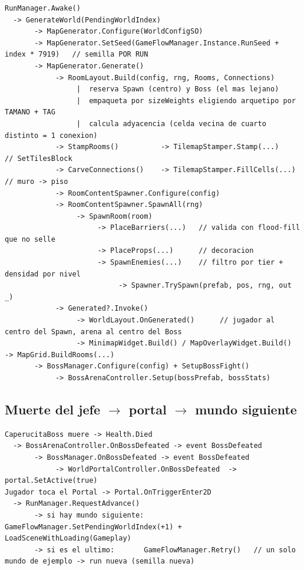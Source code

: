 \documentclass[11pt,a4paper]{article}
\begin{document}
\begin{lstlisting}
RunManager.Awake()
  -> GenerateWorld(PendingWorldIndex)
       -> MapGenerator.Configure(WorldConfigSO)
       -> MapGenerator.SetSeed(GameFlowManager.Instance.RunSeed + index * 7919)   // semilla POR RUN
       -> MapGenerator.Generate()
            -> RoomLayout.Build(config, rng, Rooms, Connections)
                 |  reserva Spawn (centro) y Boss (el mas lejano)
                 |  empaqueta por sizeWeights eligiendo arquetipo por TAMANO + TAG
                 |  calcula adyacencia (celda vecina de cuarto distinto = 1 conexion)
            -> StampRooms()          -> TilemapStamper.Stamp(...)      // SetTilesBlock
            -> CarveConnections()    -> TilemapStamper.FillCells(...)  // muro -> piso
            -> RoomContentSpawner.Configure(config)
            -> RoomContentSpawner.SpawnAll(rng)
                 -> SpawnRoom(room)
                      -> PlaceBarriers(...)   // valida con flood-fill que no selle
                      -> PlaceProps(...)      // decoracion
                      -> SpawnEnemies(...)    // filtro por tier + densidad por nivel
                           -> Spawner.TrySpawn(prefab, pos, rng, out _)
            -> Generated?.Invoke()
                 -> WorldLayout.OnGenerated()      // jugador al centro del Spawn, arena al centro del Boss
                 -> MinimapWidget.Build() / MapOverlayWidget.Build()  -> MapGrid.BuildRooms(...)
       -> BossManager.Configure(config) + SetupBossFight()
            -> BossArenaController.Setup(bossPrefab, bossStats)
\end{lstlisting}

\subsection{Muerte del jefe $\rightarrow$ portal $\rightarrow$ mundo siguiente}

\begin{lstlisting}
CaperucitaBoss muere -> Health.Died
  -> BossArenaController.OnBossDefeated -> event BossDefeated
       -> BossManager.OnBossDefeated -> event BossDefeated
            -> WorldPortalController.OnBossDefeated  -> portal.SetActive(true)
Jugador toca el Portal -> Portal.OnTriggerEnter2D
  -> RunManager.RequestAdvance()
       -> si hay mundo siguiente: GameFlowManager.SetPendingWorldIndex(+1) + LoadSceneWithLoading(Gameplay)
       -> si es el ultimo:       GameFlowManager.Retry()   // un solo mundo de ejemplo -> run nueva (semilla nueva)
\end{lstlisting}
\end{document}
